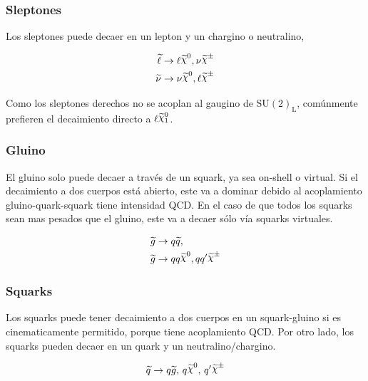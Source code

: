 \subsubsection{Sleptones}

Los sleptones puede decaer en un lepton y un chargino o neutralino,

\begin{align}
  \slepton &\to \ell \nino, \nu\chinopm \\ \snu &\to \nu\nino, \ell\chinopm
\end{align}

Como los sleptones derechos no se acoplan al gaugino de $\text{SU}(2)_\text{L}$,
comúnmente prefieren el decaimiento directo a $\ell\ninoone$.


\subsubsection{Gluino}

El gluino solo puede decaer a través de un squark, ya sea on-shell o virtual. Si
el decaimiento a dos cuerpos está abierto, este va a dominar debido al
acoplamiento gluino-quark-squark tiene intensidad QCD. En el caso de que todos
los squarks sean mas pesados que el gluino, este va a decaer sólo vía squarks
virtuales.

\begin{align}
  &\gluino \to q\susy{q}, \\
  &\gluino \to qq\nino, qq^\prime \chinopm
\end{align}


\subsubsection{Squarks}

Los squarks puede tener decaimiento a dos cuerpos en un squark-gluino si es
cinematicamente permitido, porque tiene acoplamiento QCD. Por otro
lado, los squarks pueden decaer en un quark y un neutralino/chargino.

\begin{equation}
  \susy{q} \to q\gluino, \, q\nino, \, q^\prime \chinopm
\end{equation}



